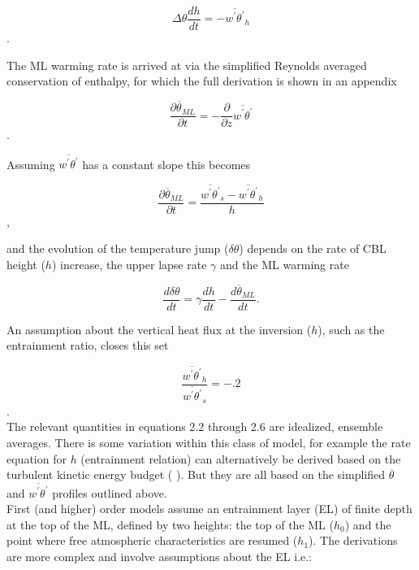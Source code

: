 \begin{equation}
\Delta \theta \frac{dh}{dt} = -\overline{w^{'}\theta^{'}}_{h} 
\end{equation}.  

The \acs{ML} warming rate is arrived at via the simplified Reynolds averaged conservation of enthalpy, for which
the full derivation is shown in an appendix

\begin{equation}
\frac{\partial \overline{\theta}_{ML}}{\partial t} = -\frac{\partial}{\partial z}\overline{w^{'}\theta^{'}}
\end{equation}.

Assuming $\overline{w^{'}\theta^{'}}$ has a constant slope this becomes

\begin{equation}
\frac{\partial \overline{\theta}_{ML}}{\partial t} = \frac{\overline{w^{'}\theta^{'}}_{s}-\overline{w^{'}\theta^{'}}_{h}}{h}
\end{equation},

and the evolution of the temperature jump ($\delta \theta$) depends on the rate of \acs{CBL} height ($h$) increase, 
the upper lapse rate $\gamma$ and the \acs{ML} warming rate
  
\begin{equation}
\frac{d\delta \theta}{dt} = \gamma\frac{dh}{dt} - \frac{d\overline{\theta}_{ML}}{dt}.
\end{equation}

An assumption about the vertical heat flux at the inversion ($h$), such as the entrainment ratio, closes this set

\begin{equation}
\frac{\overline{w^{'}\theta^{'}}_{h}}{\overline{w^{'}\theta^{'}}_{s}} = -.2
\end{equation}.\\

The relevant quantities in equations 2.2 through 2.6 are idealized, ensemble averages. There is some variation within this class of model, for example the rate equation for $h$ (entrainment relation) can alternatively be derived based on the turbulent kinetic energy budget 
(\citeauthor{FedConzMir04} \cite{FedConzMir04}).  But they are all based on the simplified $\overline{\theta}$ and 
$\overline{w^{'}\theta^{'}}$ profiles outlined above.\\  

First (and higher) order models assume an entrainment layer (\acs{EL}) of finite depth at the top of the ML, defined by two heights:
the top of the ML ($h_{0}$) and the point where free atmospheric characteristics are resumed ($h_{1}$).  The derivations are more complex and 
involve assumptions about the \acs{EL} i.e.: 

